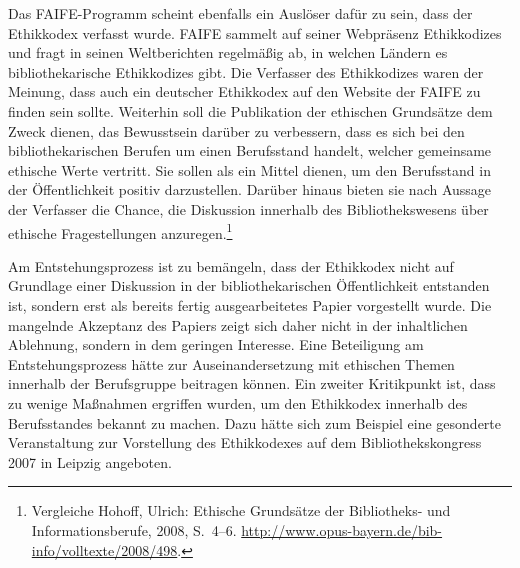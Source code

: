 \documentclass[output=paper]{langscibook}
\begin{document}
Das FAIFE-Programm scheint ebenfalls ein Auslöser dafür zu sein, dass
der Ethikkodex verfasst wurde. FAIFE sammelt auf seiner Webpräsenz
Ethikkodizes und fragt in seinen Weltberichten regelmäßig ab, in welchen
Ländern es bibliothekarische Ethikkodizes gibt. Die Verfasser des
Ethikkodizes waren der Meinung, dass auch ein deutscher Ethikkodex auf
den Website der FAIFE zu finden sein sollte. Weiterhin soll die
Publikation der ethischen Grundsätze dem Zweck dienen, das Bewusstsein
darüber zu verbessern, dass es sich bei den bibliothekarischen Berufen
um einen Berufsstand handelt, welcher gemeinsame ethische Werte
vertritt. Sie sollen als ein Mittel dienen, um den Berufsstand in der
Öffentlichkeit positiv darzustellen. Darüber hinaus bieten sie nach
Aussage der Verfasser die Chance, die Diskussion innerhalb des
Bibliothekswesens über ethische Fragestellungen anzuregen.\footnote{Vergleiche
  Hohoff, Ulrich: Ethische Grundsätze der Bibliotheks- und
  Informationsberufe, 2008, S.~4--6.
  \url{http://www.opus-bayern.de/bib-info/volltexte/2008/498}.}

Am Entstehungsprozess ist zu bemängeln, dass der Ethikkodex nicht auf
Grundlage einer Diskussion in der bibliothekarischen Öffentlichkeit
entstanden ist, sondern erst als bereits fertig ausgearbeitetes Papier
vorgestellt wurde. Die mangelnde Akzeptanz des Papiers zeigt sich daher
nicht in der inhaltlichen Ablehnung, sondern in dem geringen Interesse.
Eine Beteiligung am Entstehungsprozess hätte zur Auseinandersetzung mit
ethischen Themen innerhalb der Berufsgruppe beitragen können. Ein
zweiter Kritikpunkt ist, dass zu wenige Maßnahmen ergriffen wurden, um
den Ethikkodex innerhalb des Berufsstandes bekannt zu machen. Dazu hätte
sich zum Beispiel eine gesonderte Veranstaltung zur Vorstellung des
Ethikkodexes auf dem Bibliothekskongress 2007 in Leipzig angeboten.
\end{document}
